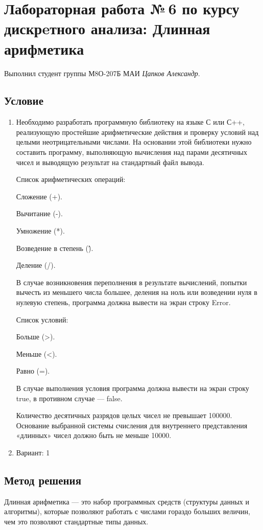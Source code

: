 \documentclass[12pt]{article}
\begin{document}
\section*{Лабораторная работа №\,6 по курсу дискрeтного анализа: Длинная арифметика}

Выполнил студент группы М8О-207Б МАИ \textit{Цапков Александр}.

\subsection*{Условие}

\begin{enumerate}
\item Необходимо разработать программную библиотеку на языке С или С++, реализующую простейшие арифметические действия и проверку условий над целыми неотрицательными числами. На основании этой библиотеки нужно составить программу, выполняющую вычисления над парами десятичных чисел и выводящую результат на стандартный файл вывода.

Список арифметических операций:

Сложение (+).

Вычитание (-).

Умножение (*).

Возведение в степень (\^).

Деление (/).

В случае возникновения переполнения в результате вычислений, попытки вычесть из меньшего числа большее, деления на ноль или возведении нуля в нулевую степень, программа должна вывести на экран строку Error.

Список условий:

Больше (>).

Меньше (<).

Равно (=).

В случае выполнения условия программа должна вывести на экран строку true, в противном случае — false.

Количество десятичных разрядов целых чисел не превышает 100000. Основание выбранной системы счисления для внутреннего представления «длинных» чисел должно быть не меньше 10000.
\item Вариант: 1
\end{enumerate}

\subsection*{Метод решения}
Длинная арифметика — это набор программных средств (структуры данных и алгоритмы), которые позволяют работать с числами гораздо больших величин, чем это позволяют стандартные типы данных.
\end{document}
